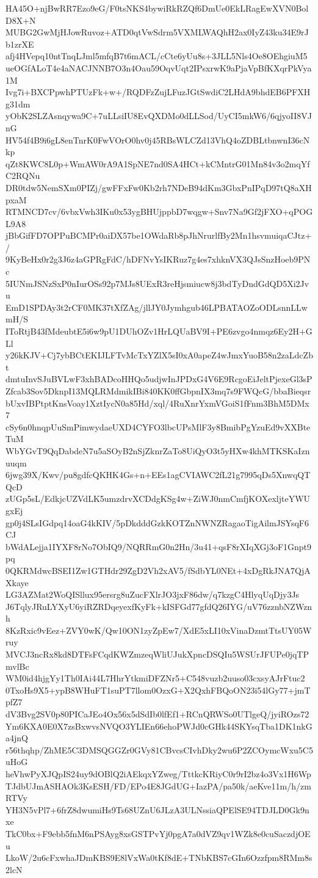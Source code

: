 HA45O+njBwRR7Ezo9eG/F0tsNKS4bywiRkRZQf6DmUe0EkLRagEwXVN0BolD8X+N
MUBG2GwMjHJowRuvoz+ATD0qtVwSdrm5VXMLWAQhH2ax0IyZ43ku34E9rJb1zrXE
afj4HVepq10ntTnqLJml5mfqB7t6mACL/cCte6yUu8s+3JLL5Nls4Oe8OEhgiuM5
ueOGfALoT4e4aNACJNNB7O3n4Oau59OqvUqt2IPsxrwK9aPjaVpBfKXqrPkVya1M
Ivg7i+BXCPpwhPTUzFk+w+/RQDFzZujLFuzJGtSwdiC2LHdA9bhdEB6PFXHg31dm
yObK2SLZAsnqywa9C+7uLLsiIU8EvQXDMo0dLLSod/UyCI5mkW6/6qjyoII8VJnG
HV54f4B9i6gL8enTnrK0FwVOrO0hv0j45RBsWLCZd13VhQ4oZDBLtbnwnI36cNkp
qZt8KWC8L0p+WmAW0rA9A1SpNE7nd0SA4HCt+kCMntrG01Mn84v3o2mqYfC2RQNu
DR0tdw5NemSXm0PIZj/gwFFxFw0Kb2rh7NDeB94dKm3GbxPnIPqD97tQ8aXHpxaM
RTMNCD7cv/6vbxVwh3IKu0x53ygBHUjppbD7wqgw+Snv7Na9Gf2jFXO+qPOGL9A8
jBbGifFD7OPPuBCMPr0aiDX57be1OWdaRb8pJhNrurlfBy2Mn1hsvmuiqaCJtz+/
9KyBeHx0r2g3J6z4aGPRgFdC/hDFNvYsIKRuz7g4es7xhknVX3QJsSnzHoeb9PNc
5IUNmJSNzSxP0nIurOSs92p7MJs8UExR3reHjsmiucw8j3bdTyDndGdQD5Xi2Jvu
EmD1SPDAy3t2rCF0MK37tXfZAg/jllJY0Jymhgub46LPBATAOZoODLsnnLLwmH/S
IToRtjB43fMdeubtE5i6w9pU1DUhOZv1HrLQUaBV9I+PE6zvgo4nmqz6Ey2H+GLl
y26kKJV+Cj7ybBCtEKIJLFTvMcTxYZlX5sI0xA0apeZ4wJmxYuoB58n2zaLdcZbt
dmtuInvSJuBVLwF3xhBADcoHHQo5udjwInJPDxG4V6E9RcgoEiJeltPjexeGl3sP
Zfcab3Sov5DknpI13MQLRMdmikIBi840KK0ffGbpnIX3mq7s9FWQcG/bbaBieqsr
bUxvIBPtptKnsVoay1XztIycN0a85Hd/xql/4RuXnrYxmVGoiS1fFnm3BhM5DMx7
cSy6n0hnqpUuSmPimwydaeUXD4CYFO3lbcUPsMlF3y8BmibPgYzuEd9vXXBteTuM
WbYGvT9QqDabdeN7u5aSOyB2nSjZknrZaTo8UiQyO3t5yHXw4khMTKSKaIznuuqm
6jwg39X/Kwv/pu8gdfcQKHK4Gs+n+EEs1agCVIAWC2fL21g7995qDs5XnwqQTQcD
zUGp5sL/EdkjcUZVdLK5umzdrvXCDdgKSg4w+ZiWJ0nmCmfjKOXexljteYWUgxEj
gp0j4SLsIGdpq14oaG4kKIV/5pDkdddGzkKOTZnNWNZRagaoTigAilmJSYsqF6CJ
bWdALejja1IYXF8rNo7ObIQ9/NQRRmG0n2Hn/3u41+qsF8rXIqXGj3oF1Gnpt9pq
0QKRMdwcBSEI1Zw1GTHdr29ZgD2Vh2xAV5/fSdbYL0NEt+4xDgRkJNA7QjAXkaye
LG3AZMat2WoQISllux95ersrg8uZucFXlrJO3jxF86dw/q7kzgC4HlyqUqDjy3Js
J6TqlyJRuLYXyU6yiRZRDqeyexfKyFk+kISFGd77gfdQ26IYG/uV76zznbNZWznh
8KzRxic9vEez+ZVY0wK/Qw10ON1zyZpEw7/XdE5xLI10xVinaDzmtTtsUY05Wruy
MVCJ3ncRx8kd8DTFsFCqdKWZmzeqWliUJukXpncDSQIu5WSUrJFUPe0jqTPmvlBc
WM0id4hjgYy1Th0IAi44L7HhrYtkmiDFZNr5+C548vuzb2uuso03cxsyAJrFtuc2
0TxoHs9X5+ypB8WHuFT1suPT7llom0OzxG+X2QxhFBQoON23i54lGy77+jmTpfZ7
dV3Bvg2SV0p80PICaJEo4Ox56x5dSdIb0lfEf1+RCnQRWSo0UTlgeQ/jyiROzs72
Ym6KXA0E0X7zsBxwvsNVQO3YLIEn66ehoPWJd0cGHk44SKYsqTba1DK1nkGa4jnQ
r56thqhp/ZhME5C3DMSQGGZr0GVy81CBvcsCIvhDky2wu6P2ZCOymcWxu5C5uHoG
heVhwPyXJQpIS24uy9dOBlQ2iAEkqxYZweg/TttkcKRiyC0r9rI2bz4o3Vx1H6Wp
TJdbUJmASHAOk3KsESH/FD/EPo4E8JGdUG+IazPA/pa50k/aeKve11m/h/zmRTVy
YH3N5vPl7+6frZ8dwumiHs9Ts68UZnU6JLzA3ULNssiaQPElSE94TDJLD0Gk9nxe
TkC0bx+F9ebb5fnM6nPSAyg8xsGSTPvYj0pgA7a0dVZ9qv1WZk8e0cuSaczdjOEu
LkoW/2u6cFxwhaJDmKBS9E8lVxWa0tKf8dE+TNbKBS7cGIn6Ozzfpm8RMm8s2lcN
